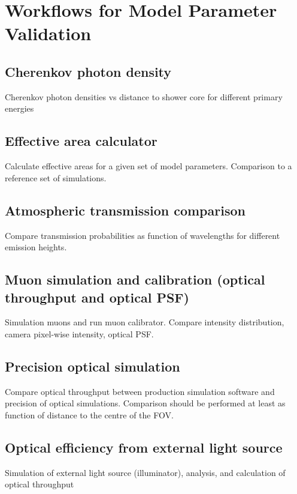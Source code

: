 \section{Workflows for Model Parameter Validation}

\subsection{Cherenkov photon density}

Cherenkov photon densities vs distance to shower core for different primary energies

\subsection{Effective area calculator}

Calculate effective areas for a given set of model parameters. Comparison to a reference set of simulations.

\subsection{Atmospheric transmission comparison}

Compare transmission probabilities as function of wavelengths for different emission heights.

\subsection{Muon simulation and calibration (optical throughput and optical PSF)}

Simulation muons and run muon calibrator. Compare intensity distribution, camera pixel-wise intensity, optical PSF.

\subsection{Precision optical simulation}

Compare optical throughput between production simulation software and precision of optical simulations.
Comparison should be performed at least as function of distance to the centre of the FOV.


\subsection{Optical efficiency from external light source}

Simulation of external light source (illuminator), analysis, and calculation of optical throughput

